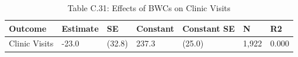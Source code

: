 \begin{table}

\caption{Table C.31: Effects of BWCs on Clinic Visits}
\centering
\begin{tabular}[t]{lllllll}
\toprule
Outcome & Estimate & SE & Constant & Constant SE & N & R2\\
\midrule
Clinic Visits & -23.0 & (32.8) & 237.3 & (25.0) & 1,922 & 0.000\\
\bottomrule
\end{tabular}
\end{table}
